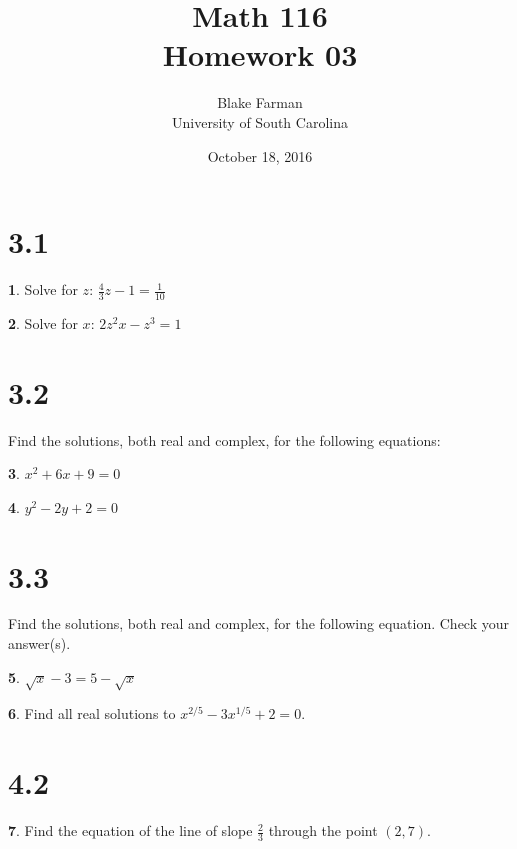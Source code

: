 \documentclass[12pt]{book}
\author{Blake Farman\\University of South Carolina}
\title{Math 116\\Homework 03}
\date{October 18, 2016}
\theoremstyle{definition}
\newtheorem{thm}{}
\begin{document}
\maketitle

\section*{3.1}

\setcounter{thm}{4}
\begin{thm}
  Solve for $z$: \quad $\displaystyle{\frac{4}{3}z - 1 = \frac{1}{10}}$
\end{thm}

\setcounter{thm}{11}
\begin{thm}
  Solve for $x$: \quad $\displaystyle{2z^2x - z^3 = 1}$
\end{thm}

\section*{3.2}
Find the solutions, both real and complex, for the following equations:
\setcounter{thm}{2}
\begin{thm}
  $\displaystyle{x^2 + 6x + 9 = 0}$
\end{thm}

\setcounter{thm}{6}
\begin{thm}
  $\displaystyle{y^2 - 2y + 2 = 0}$
\end{thm}

\section*{3.3}

\setcounter{thm}{16}
Find the solutions, both real and complex, for the following equation.  Check your answer(s).
\begin{thm}
  $\displaystyle{\sqrt{x} - 3 = 5 - \sqrt{x}}$
\end{thm}

\setcounter{thm}{21}
\begin{thm}
  Find all real solutions to $\displaystyle{x^{2/5} - 3x^{1/5} + 2 = 0}$.
  $\displaystyle{}$
\end{thm}

\section*{4.2}

\setcounter{thm}{5}
\begin{thm}
  Find the equation of the line of slope $\displaystyle{\frac{2}{3}}$ through the point $(2,7)$.
\end{thm}
\end{document}
